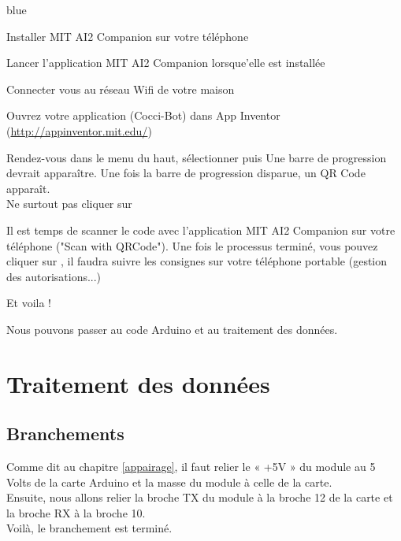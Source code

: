 \begin{items}{blue}{\Triangle}
    \item Installer MIT AI2 Companion sur votre téléphone 
    \item Lancer l'application MIT AI2 Companion lorsque'elle est installée 
    \item Connecter vous au réseau Wifi de votre maison 
    \item Ouvrez votre application (Cocci-Bot) dans App Inventor (\url{http://appinventor.mit.edu/}) 
    \item Rendez-vous dans le menu du haut, sélectionner  puis 
    Une barre de progression devrait apparaître.
    Une fois la barre de progression disparue, un QR Code apparaît. \\ {\color{red}Ne surtout pas cliquer sur }
    
   \item Il est temps de scanner le code avec l'application MIT AI2 Companion sur votre téléphone ("Scan with QRCode"). Une fois le processus terminé, vous pouvez cliquer sur , il faudra suivre les consignes sur votre téléphone portable (gestion des autorisations...)
   \item Et voila !
    
\end{items}

Nous pouvons passer au code Arduino et au traitement des données.\chapter{Traitement des données}

\section{Branchements}

Comme dit au chapitre \ref{appairage}, il faut relier le « +5V » du module au  5 Volts de la carte Arduino et la masse du module à celle de la carte.\\
Ensuite, nous allons relier la broche TX du module à la broche 12 de la carte et la broche RX à la broche 10. \\
Voilà, le branchement est terminé.

